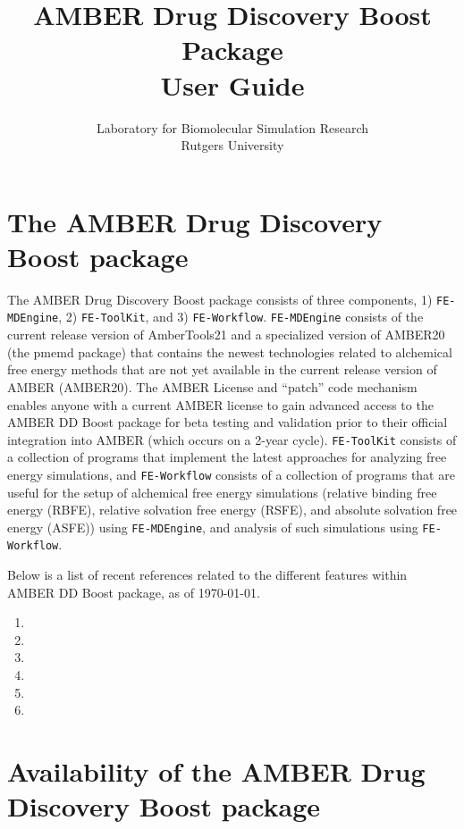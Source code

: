 \documentclass[11pt,letterpaper,titlepage]{article}
\title{%
{\bf AMBER Drug Discovery Boost Package} \\
\Large User Guide}
\author{Laboratory for Biomolecular Simulation Research \\
\large Rutgers University}
\newcommand{\addb}{\texttt{FE-MDEngine}}
\newcommand{\tk}{\texttt{FE-ToolKit}}
\newcommand{\wf}{\texttt{FE-Workflow}}
\begin{document}
\nobibliography*
\maketitle

\section {The AMBER Drug Discovery Boost package}
\vspace{0.1cm}

The AMBER Drug Discovery Boost package consists of three components, 
1) \addb{}, 2) \tk{}, and 3) \wf{}. \addb{} consists of the 
current release version of
AmberTools21 and a specialized version of AMBER20 (the pmemd package) 
that contains the newest technologies related to alchemical free 
energy methods that are not yet available in the current 
release version of AMBER (AMBER20). 
The AMBER License and “patch” code mechanism enables anyone
with a current AMBER license to gain advanced access to  
the AMBER DD Boost package for beta testing and 
validation prior to their official integration into AMBER (which occurs 
on a 2-year cycle).
\tk{} consists of a collection of programs that 
implement the latest approaches for analyzing free energy simulations, 
and \wf{} consists of a collection of programs that are useful
for the setup of alchemical free energy simulations (relative binding
free energy (RBFE), relative solvation free energy (RSFE), and 
absolute solvation free energy (ASFE)) using \addb{}, and 
analysis of such simulations using \wf{}. 

Below is a list of recent references related to the different 
features within AMBER DD Boost package, as of \today. 
\begin{enumerate}
	\item{}
	\item{}
	\item{}
	\item{}
	\item{}
	\item{}
\end{enumerate}


\vspace{0.1cm}
\section {Availability of the AMBER Drug Discovery Boost package}
\vspace{0.1cm}
\end{document}
